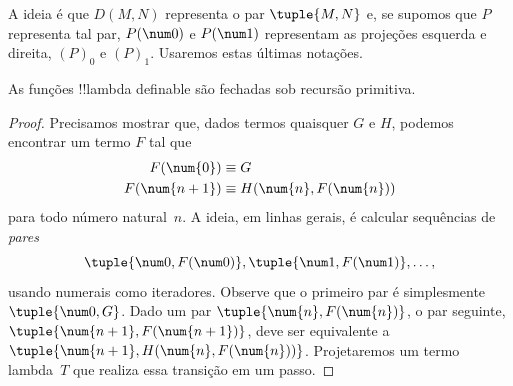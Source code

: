 \documentclass[../../../include/open-logic-section]{subfiles}
\begin{document}
A ideia é que $D(M,N)$ representa o par $\tuple{M, N}$ e, se supomos que
$P$ representa tal par, $P(\num 0)$ e $P(\num 1)$ representam as projeções
esquerda e direita, $(P)_0$ e $(P)_1$. Usaremos estas últimas notações.

\begin{lem}
As funções !!{lambda definable} são fechadas sob recursão primitiva.
\end{lem}

\begin{proof}
Precisamos mostrar que, dados termos quaisquer $G$ e $H$, podemos encontrar
um termo $F$ tal que
\begin{align*}
F(\num{0}) & \equiv G \\
F(\num{n+1}) & \equiv H(\num{n}, F(\num{n}))
\end{align*}
para todo número natural~$n$. A ideia, em linhas gerais, é calcular
sequências de \emph{pares}
\[
\tuple{\num 0, F(\num 0)}, \tuple{\num 1, F(\num 1)}, \dots,
\]
usando numerais como iteradores. Observe que o primeiro par é simplesmente
$\tuple{\num 0, G}$. Dado um par $\tuple{\num{n}, F(\num{n})}$, o par
seguinte, $\tuple{\num{n+1}, F(\num{n+1})}$, deve ser equivalente a
$\tuple{\num{n+1}, H(\num{n}, F(\num{n}))}$. Projetaremos um termo
lambda~$T$ que realiza essa transição em um passo.


\end{proof}
\end{document}
